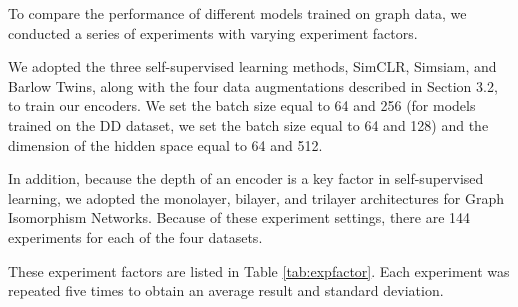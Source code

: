 To compare the performance of different models trained on graph data, we conducted a series of experiments with varying experiment factors.

We adopted the three self-supervised learning methods, SimCLR, Simsiam, and Barlow Twins, along with the four data augmentations described in Section 3.2, to train our encoders. We set the batch size equal to 64 and 256 (for models trained on the DD dataset, we set the batch size equal to 64 and 128) and the dimension of the hidden space equal to 64 and 512. 


In addition, because the depth of an encoder is a key factor in self-supervised learning, we adopted the monolayer, bilayer, and trilayer architectures for Graph Isomorphism Networks. Because of these experiment settings, there are 144 experiments for each of the four datasets.

These experiment factors are listed in Table \ref{tab:expfactor}. Each experiment was repeated five times to obtain an average result and standard deviation.


